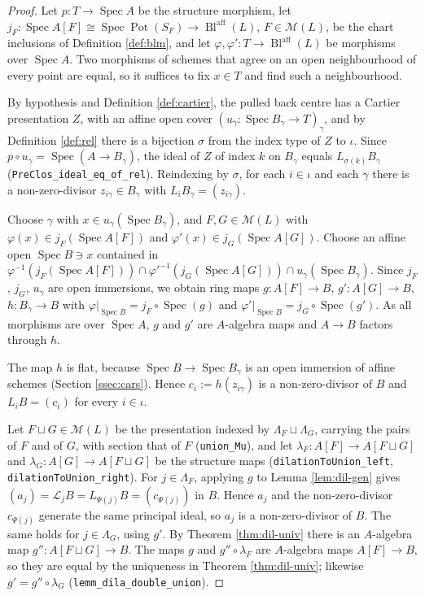 \documentclass[pdflatex,sn-mathphys-num]{sn-jnl}
\theoremstyle{plain}
\theoremstyle{definition}
\newcommand{\Spec}{\operatorname{Spec}}
\newcommand{\Pot}{\operatorname{Pot}}
\newcommand{\BlM}{\operatorname{Bl}^{\mathrm{aff}}}
\newcommand{\Pres}{\mathcal{M}}
\newcommand{\cL}{\mathcal{L}}
\begin{document}
\begin{proof}
Let $p : T \to \Spec A$ be the structure morphism, let
$j_F : \Spec A[F] \cong \Spec \Pot(S_F) \to \BlM(L)$, $F \in \Pres(L)$, be the
chart inclusions of Definition \ref{def:blm}, and let
$\varphi, \varphi' : T \to \BlM(L)$ be morphisms over $\Spec A$. Two morphisms
of schemes that agree on an open neighbourhood of every point are equal, so it
suffices to fix $x \in T$ and find such a neighbourhood.

By hypothesis and Definition \ref{def:cartier}, the pulled back centre has a
Cartier presentation $Z$, with an affine open cover
$(u_\gamma : \Spec B_\gamma \to T)_\gamma$, and by Definition \ref{def:rel}
there is a bijection $\sigma$ from the index type of $Z$ to $\iota$. Since
$p \circ u_\gamma = \Spec(A \to B_\gamma)$, the ideal of $Z$ of index $k$ on
$B_\gamma$ equals $L_{\sigma(k)} B_\gamma$
(\texttt{PreClos\_ideal\_eq\_of\_rel}). Reindexing by $\sigma$, for each
$i \in \iota$ and each $\gamma$ there is a non-zero-divisor
$z_{i\gamma} \in B_\gamma$ with $L_i B_\gamma = (z_{i\gamma})$.

Choose $\gamma$ with $x \in u_\gamma(\Spec B_\gamma)$, and
$F, G \in \Pres(L)$ with $\varphi(x) \in j_F(\Spec A[F])$ and
$\varphi'(x) \in j_G(\Spec A[G])$. Choose an affine open $\Spec B \ni x$
contained in
$\varphi^{-1}(j_F(\Spec A[F])) \cap \varphi'^{-1}(j_G(\Spec A[G])) \cap u_\gamma(\Spec B_\gamma)$.
Since $j_F$, $j_G$, $u_\gamma$ are open immersions, we obtain ring maps
$g : A[F] \to B$, $g' : A[G] \to B$, $h : B_\gamma \to B$ with
$\varphi|_{\Spec B} = j_F \circ \Spec(g)$ and
$\varphi'|_{\Spec B} = j_G \circ \Spec(g')$. As all morphisms are over
$\Spec A$, $g$ and $g'$ are $A$-algebra maps and $A \to B$ factors through $h$.

The map $h$ is flat, because $\Spec B \to \Spec B_\gamma$ is an open immersion
of affine schemes (Section \ref{ssec:cars}). Hence $c_i := h(z_{i\gamma})$ is
a non-zero-divisor of $B$ and $L_i B = (c_i)$ for every $i \in \iota$.

Let $F \sqcup G \in \Pres(L)$ be the presentation indexed by
$\Lambda_F \sqcup \Lambda_G$, carrying the pairs of $F$ and of $G$, with
section that of $F$ (\texttt{union\_Mu}), and let
$\lambda_F : A[F] \to A[F \sqcup G]$ and $\lambda_G : A[G] \to A[F \sqcup G]$
be the structure maps (\texttt{dilationToUnion\_left},
\texttt{dilationToUnion\_right}). For $j \in \Lambda_F$, applying $g$ to Lemma \ref{lem:dil-gen} gives
$(a_j) = \cL_j B = L_{\Psi(j)} B = (c_{\Psi(j)})$ in $B$. Hence $a_j$ and the
non-zero-divisor $c_{\Psi(j)}$ generate the same principal ideal, so $a_j$ is a
non-zero-divisor of $B$. The same holds for $j \in \Lambda_G$, using $g'$. By
Theorem \ref{thm:dil-univ} there is an $A$-algebra map
$g'' : A[F \sqcup G] \to B$. The maps $g$ and $g'' \circ \lambda_F$ are
$A$-algebra maps $A[F] \to B$, so they are equal by the uniqueness in Theorem
\ref{thm:dil-univ}; likewise $g' = g'' \circ \lambda_G$
(\texttt{lemm\_dila\_double\_union}).


\end{proof}
\end{document}

